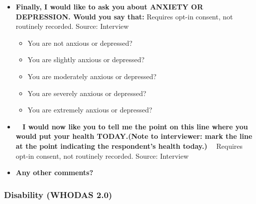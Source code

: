 \documentclass[
]{scrartcl}
\providecommand{\tightlist}{%
  \setlength{\itemsep}{0pt}\setlength{\parskip}{0pt}}\usepackage{longtable,booktabs,array}
\begin{document}
\begin{itemize}
  \begin{itemize}
  \tightlist
  \item
    You have no pain or discomfort?
  \item
    You have slight pain or discomfort?
  \item
    You have moderate pain or discomfort?
  \item
    You have severe pain or discomfort?
  \item
    You have extreme pain or discomfort?
  \end{itemize}
\item
  \textbf{Finally, I would like to ask you about ANXIETY OR DEPRESSION.
  Would you say that:} Requires opt-in consent, not routinely recorded.
  Source: Interview

  \begin{itemize}
  \tightlist
  \item
    You are not anxious or depressed?
  \item
    You are slightly anxious or depressed?
  \item
    You are moderately anxious or depressed?
  \item
    You are severely anxious or depressed?
  \item
    You are extremely anxious or depressed?
  \end{itemize}
\item
  \textbf{~ I would now like you to tell me the point on this line where
  you would put your health TODAY.(Note to interviewer: mark the line at
  the point indicating the respondent's health today.) ~} Requires
  opt-in consent, not routinely recorded. Source: Interview
\item
  \textbf{Any other comments?}
\end{itemize}

\subsubsection{Disability (WHODAS 2.0)}\label{disability-whodas-2.0}
\end{document}
